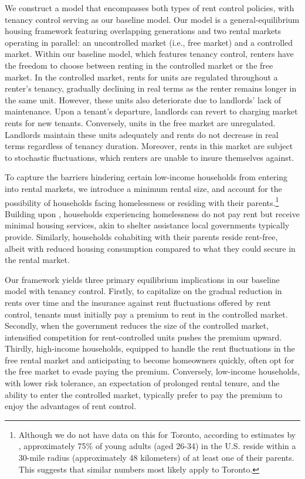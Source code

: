 \documentclass[parskip=full]{article}
\begin{document}
We construct a model that encompasses both types of rent control policies, with tenancy control serving as our baseline model. Our model is a general-equilibrium housing framework featuring overlapping generations and two rental markets operating in parallel: an uncontrolled market (i.e., free market) and a controlled market. Within our baseline model, which features tenancy control, renters have the freedom to choose between renting in the controlled market or the free market. In the controlled market, rents for units are regulated throughout a renter's tenancy, gradually declining in real terms as the renter remains longer in the same unit. However, these units also deteriorate due to landlords' lack of maintenance. Upon a tenant's departure, landlords can revert to charging market rents for new tenants. Conversely, units in the free market are unregulated. Landlords maintain these units adequately and rents do not decrease in real terms regardless of tenancy duration. Moreover, rents in this market are subject to stochastic fluctuations, which renters are unable to insure themselves against.

To capture the barriers hindering certain low-income households from entering into rental markets, we introduce a minimum rental size, and account for the possibility of households facing homelessness or residing with their parents.\footnote{Although we do not have data on this for Toronto, according to estimates by \citet{spatial_distance-2020}, approximately 75\% of young adults (aged 26-34) in the U.S. reside within a 30-mile radius (approximately 48 kilometers) of at least one of their parents. This suggests that similar numbers most likely apply to Toronto.} Building upon \citet{az-2024}, households experiencing homelessness do not pay rent but receive minimal housing services, akin to shelter assistance local governments typically provide. Similarly, households cohabiting with their parents reside rent-free, albeit with reduced housing consumption compared to what they could secure in the rental market.

Our framework yields three primary equilibrium implications in our baseline model with tenancy control. Firstly, to capitalize on the gradual reduction in rents over time and the insurance against rent fluctuations offered by rent control, tenants must initially pay a premium to rent in the controlled market. Secondly, when the government reduces the size of the controlled market, intensified competition for rent-controlled units pushes the premium upward. Thirdly, high-income households, equipped to handle the rent fluctuations in the free rental market and anticipating to become homeowners quickly, often opt for the free market to evade paying the premium. Conversely, low-income households, with lower risk tolerance, an expectation of prolonged rental tenure, and the ability to enter the controlled market, typically prefer to pay the premium to enjoy the advantages of rent control.
\end{document}
